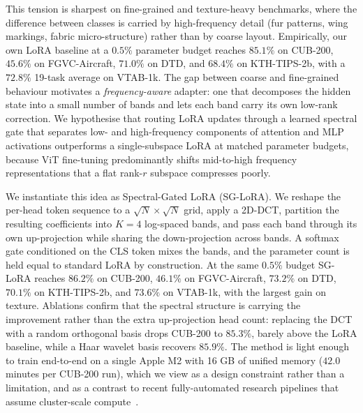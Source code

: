 \documentclass{article}
\begin{document}
This tension is sharpest on fine-grained and texture-heavy benchmarks, where the difference between classes is carried by high-frequency detail (fur patterns, wing markings, fabric micro-structure) rather than by coarse layout. Empirically, our own LoRA baseline at a $0.5\%$ parameter budget reaches $85.1\%$ on CUB-200, $45.6\%$ on FGVC-Aircraft, $71.0\%$ on DTD, and $68.4\%$ on KTH-TIPS-2b, with a $72.8\%$ 19-task average on VTAB-1k. The gap between coarse and fine-grained behaviour motivates a \emph{frequency-aware} adapter: one that decomposes the hidden state into a small number of bands and lets each band carry its own low-rank correction. We hypothesise that routing LoRA updates through a learned spectral gate that separates low- and high-frequency components of attention and MLP activations outperforms a single-subspace LoRA at matched parameter budgets, because ViT fine-tuning predominantly shifts mid-to-high frequency representations that a flat rank-$r$ subspace compresses poorly.

We instantiate this idea as Spectral-Gated LoRA (SG-LoRA). We reshape the per-head token sequence to a $\sqrt{N}\times\sqrt{N}$ grid, apply a 2D-DCT, partition the resulting coefficients into $K=4$ log-spaced bands, and pass each band through its own up-projection while sharing the down-projection across bands. A softmax gate conditioned on the CLS token mixes the bands, and the parameter count is held equal to standard LoRA by construction. At the same $0.5\%$ budget SG-LoRA reaches $86.2\%$ on CUB-200, $46.1\%$ on FGVC-Aircraft, $73.2\%$ on DTD, $70.1\%$ on KTH-TIPS-2b, and $73.6\%$ on VTAB-1k, with the largest gain on texture. Ablations confirm that the spectral structure is carrying the improvement rather than the extra up-projection head count: replacing the DCT with a random orthogonal basis drops CUB-200 to $85.3\%$, barely above the LoRA baseline, while a Haar wavelet basis recovers $85.9\%$. The method is light enough to train end-to-end on a single Apple M2 with 16 GB of unified memory ($42.0$ minutes per CUB-200 run), which we view as a design constraint rather than a limitation, and as a contrast to recent fully-automated research pipelines that assume cluster-scale compute~\citep{lu2024aiscientist, yamada2025aiscientistv2}.
\end{document}
